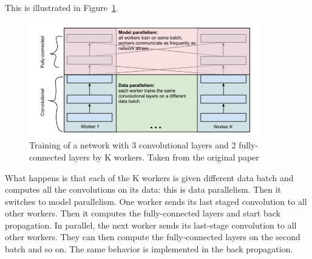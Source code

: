This is illustrated in Figure~\ref{fig:alexnet}. 
\begin{figure}[!htp]
    \centering
        \includegraphics[width=0.9\textwidth]{figures/02-alexnet}
        \caption[AlexNet architecure overview]{Training of a network with 3 convolutional layers and 2 fully-connected layers by K workers. Taken from the original paper \cite{alexpaper}}\label{fig:alexnet}
\end{figure}
What happens is that each of the K workers is given different data batch and computes all the convolutions on its data: this is data parallelism. Then it switches to model parallelism. One worker sends its last staged convolution to all other workers.  Then it computes the fully-connected layers and start back propagation. In parallel, the next worker sends its last-stage convolution to all other workers. They can then compute the fully-connected layers on the second batch and so on. The same behavior is implemented in the back propagation. 

